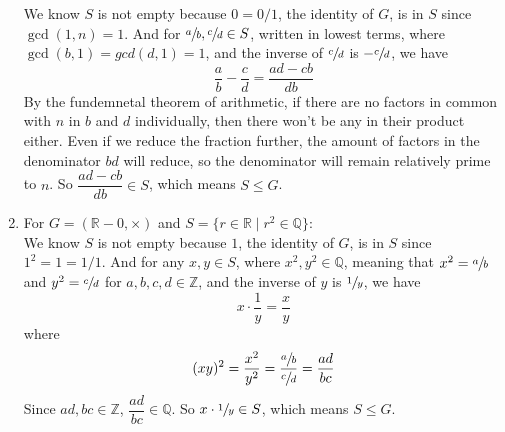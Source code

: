 \documentclass[12pt]{article}
\newcommand{\Z}{\mathbb{Z}}
\newcommand{\Q}{\mathbb{Q}}
\newcommand{\R}{\mathbb{R}}
\begin{document}
\begin{enumerate}[label=\textbf{\alph*.}]
            We know $S$ is not empty because $0 = 0/1$,
            the identity of $G$, is in $S$ since $\gcd(1, n) = 1$.
            And for $\sfrac{a}{b}, \sfrac{c}{d} \in S$,
            written in lowest terms,
            where $\gcd(b, 1) = gcd (d, 1) = 1$,
            and the inverse of $\sfrac{c}{d}$ is $-\sfrac{c}{d}$,
            we have \[\dfrac{a}{b} - \dfrac{c}{d} = \dfrac{ad - cb}{db}\]
            By the fundemnetal theorem of arithmetic,
            if there are no factors in common with $n$ in $b$ and $d$
            individually,
            then there won't be any in their product either.
            Even if we reduce the fraction further,
            the amount of factors in the denominator $bd$ will reduce,
            so the denominator will remain relatively prime to $n$.
            So $\dfrac{ad - cb}{db} \in S$,
            which means $S \leqslant G$. 
        \item 
            For $G = (\R - {0}, \times)$
            and $S = \{r \in \R \mid r^2 \in \Q\}$: \\
            We know $S$ is not empty because $1$,
            the identity of $G$, is in $S$ since $1^2 = 1 = 1/1$.
            And for any $x, y \in S$,
            where $x^2, y^2 \in \Q$,
            meaning that $x^2 = \sfrac{a}{b}$ and $y^2 = \sfrac{c}{d}$ for
            $a, b, c, d \in \Z$,
            and the inverse of $y$ is $\sfrac{1}{y}$,
            we have \[x \cdot \dfrac{1}{y} = \dfrac{x}{y}\]
            where \[(xy)^2 = \dfrac{x^2}{y^2}
            = \dfrac{\sfrac{a}{b}}{\sfrac{c}{d}}
            = \dfrac{ad}{bc}\]
            Since $ad, bc \in \Z$, $\dfrac{ad}{bc} \in \Q$.
            So $x \cdot \sfrac{1}{y} \in S$,
            which means $S \leqslant G$. 
    \end{enumerate}
\end{document}
